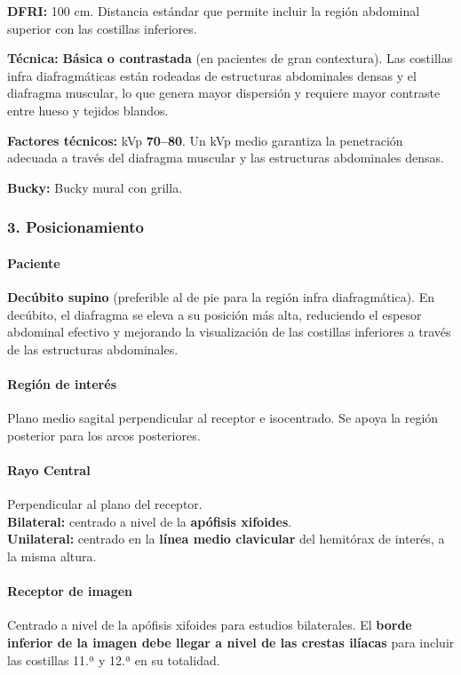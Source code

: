 	\textbf{DFRI:} 100 cm. Distancia estándar que permite incluir la región abdominal superior con las costillas inferiores.
	
	\textbf{Técnica:} \textbf{Básica o contrastada} (en pacientes de gran contextura). Las costillas infra diafragmáticas están rodeadas de estructuras abdominales densas y el diafragma muscular, lo que genera mayor dispersión y requiere mayor contraste entre hueso y tejidos blandos.
	
	\textbf{Factores técnicos:} kVp \textbf{70--80}. Un kVp medio garantiza la penetración adecuada a través del diafragma muscular y las estructuras abdominales densas.
	
	\textbf{Bucky:} Bucky mural con grilla.
	
	\subsubsection*{3. Posicionamiento}
	
	\paragraph{Paciente}
	\textbf{Decúbito supino} (preferible al de pie para la región infra diafragmática). En decúbito, el diafragma se eleva a su posición más alta, reduciendo el espesor abdominal efectivo y mejorando la visualización de las costillas inferiores a través de las estructuras abdominales.
	
	\paragraph{Región de interés}
	Plano medio sagital perpendicular al receptor e isocentrado. Se apoya la región posterior para los arcos posteriores.
	
	\paragraph{Rayo Central}
	Perpendicular al plano del receptor. \\
	\textbf{Bilateral:} centrado a nivel de la \textbf{apófisis xifoides}. \\
	\textbf{Unilateral:} centrado en la \textbf{línea medio clavicular} del hemitórax de interés, a la misma altura.
	
	\paragraph{Receptor de imagen}
	Centrado a nivel de la apófisis xifoides para estudios bilaterales. El \textbf{borde inferior de la imagen debe llegar a nivel de las crestas ilíacas} para incluir las costillas 11.ª y 12.ª en su totalidad.
	
